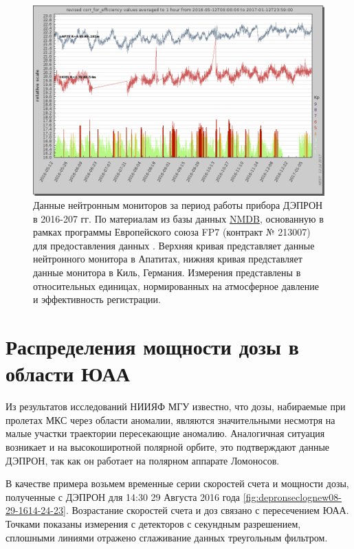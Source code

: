\begin{figure}
	\centering
	\includegraphics[width=0.7\linewidth]{images/nmdb2016}
	\caption{Данные нейтронным мониторов за период работы прибора ДЭПРОН в 2016-207 гг. По материалам из базы данных \href{www.nmdb.eu}{NMDB}, основанную в рамках программы Европейского союза FP7 (контракт № 213007) для предоставления данных \cite{Ibragimov}. Верхняя кривая представляет данные нейтронного монитора в Апатитах, нижняя кривая представляет данные монитора в Киль, Германия. Измерения представлены в относительных единицах, нормированных на атмосферное давление и эффективность регистрации.}
	\label{fig:nmdb2016}
\end{figure}

\section{Распределения мощности дозы в области ЮАА}
Из результатов исследований НИИЯФ МГУ \cite{Lishnevskii2012} известно, что дозы, набираемые при пролетах МКС через области аномалии, являются значительными несмотря на малые участки траектории пересекающие аномалию. Аналогичная ситуация возникает и на высокоширотной полярной орбите, это подтверждают данные ДЭПРОН, так как он работает на полярном аппарате Ломоносов. 

В качестве примера возьмем временные серии скоростей счета и мощности дозы, полученные с ДЭПРОН для 14:30 29 Августа 2016 года \ref{fig:depronseclognew08-29-1614-24-23}. Возрастание скоростей счета и доз связано с пересечением ЮАА. Точками показаны измерения с детекторов с секундным разрешением, сплошными линиями отражено сглаживание данных треугольным фильтром.

